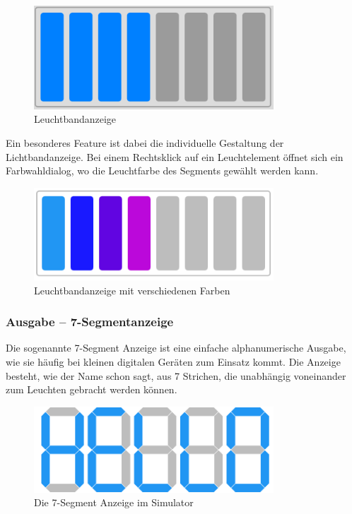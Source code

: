 \begin{figure}[ht]
	\centering
  \includegraphics[width=0.8\textwidth]{Images/Lightstrip}
	\caption{Leuchtbandanzeige}
	\label{Lightstrip}
\end{figure}

Ein besonderes Feature ist dabei die individuelle Gestaltung der
Lichtbandanzeige. Bei einem Rechtsklick auf ein Leuchtelement öffnet sich ein
Farbwahldialog, wo die Leuchtfarbe des Segments gewählt werden kann.

\begin{figure}[ht]
	\centering
  \includegraphics[width=0.8\textwidth]{Images/Lightstrip_colors}
	\caption{Leuchtbandanzeige mit verschiedenen Farben}
	\label{Lightstrip_Colors}
\end{figure}


\subsubsection{Ausgabe -- 7-Segmentanzeige}
Die sogenannte 7-Segment Anzeige ist eine einfache alphanumerische Ausgabe, wie
sie häufig bei kleinen digitalen Geräten zum Einsatz kommt. Die Anzeige besteht, wie
der Name schon sagt, aus 7 Strichen, die unabhängig voneinander zum Leuchten
gebracht werden können.

\begin{figure}[ht]
	\centering
  \includegraphics[width=0.8\textwidth]{Images/7-Segment_Hello}
	\caption{Die 7-Segment Anzeige im Simulator}
	\label{7-Segment}
\end{figure}

